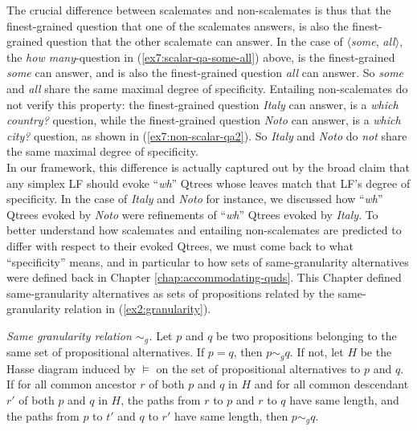 The crucial difference between scalemates and non-scalemates is thus that the finest-grained question that one of the scalemates answers, is also the finest-grained question that the other scalemate can answer. In the case of $\langle$\textit{some}, \textit{all}$\rangle$, the \textit{how many}-question in (\ref{ex7:scalar-qa-some-all}) above, is the finest-grained \textit{some} can answer, and is also  the finest-grained question \textit{all} can answer. So \textit{some} and \textit{all} share the same maximal degree of specificity. Entailing non-scalemates do not verify this property: the finest-grained question \textit{Italy} can answer, is a \textit{which country?} question, while the finest-grained question \textit{Noto} can answer, is a \textit{which city?} question, as shown in (\ref{ex7:non-scalar-qa2}). So \textit{Italy} and \textit{Noto} do \textit{not} share the same maximal degree of specificity.\\


In our framework, this difference is actually captured out by the broad claim that any simplex LF should evoke  ``\textit{wh}'' Qtrees whose leaves match that LF's degree of specificity. In the case of \textit{Italy} and \textit{Noto} for instance, we discussed how ``\textit{wh}'' Qtrees evoked by \textit{Noto} were refinements of ``\textit{wh}'' Qtrees evoked by \textit{Italy}. To better understand how scalemates and entailing non-scalemates are predicted to differ with respect to their evoked Qtrees, we must come back to what ``specificity'' means, and in particular to how sets of same-granularity alternatives were defined back in Chapter \ref{chap:accommodating-quds}. This Chapter defined same-granularity alternatives as sets of propositions related by the same-granularity relation in (\ref{ex2:granularity}). 

\begin{exe}
	 {\textit{Same granularity relation $\sim_g$.} Let $p$ and $q$ be two propositions belonging to the same set of propositional alternatives. If $p=q$, then $p \sim_g q$. If not, let $H$ be the Hasse diagram induced by $\vDash$ on the set of propositional alternatives to $p$ and $q$. If for all common ancestor $r$ of both $p$ and $q$ in $H$ and for all common descendant $r'$ of both $p$ and $q$ in $H$, the paths from $r$ to $p$ and $r$ to $q$ have same length, and the paths from $p$ to $t'$ and $q$ to $r'$ have same length, then $p \sim_g q$.}
\end{exe}

